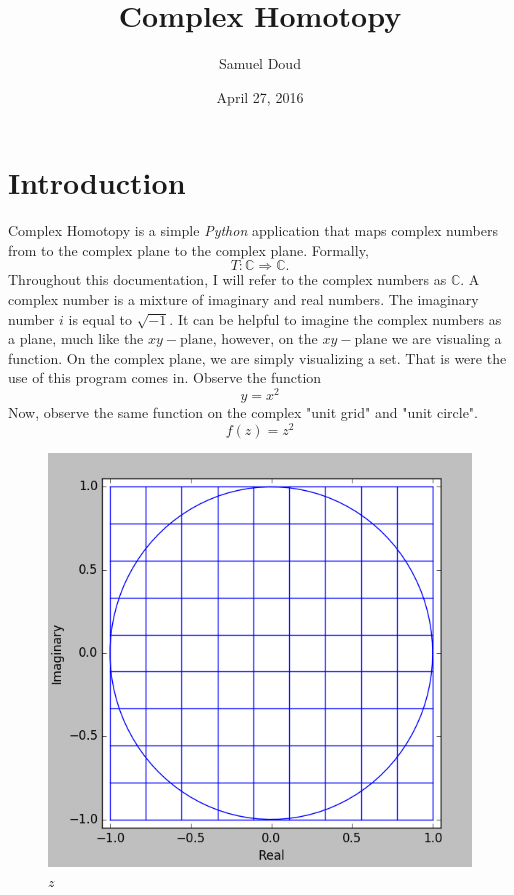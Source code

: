 \documentclass{article}
\title{Complex Homotopy}
\author{Samuel Doud}
\date{April 27, 2016}
\begin{document}
\maketitle

\section{Introduction}
    Complex Homotopy is a simple \textit{Python} application that maps complex numbers from to the complex plane to the complex plane. Formally,
    $$T:\mathbb{C}\Rightarrow \mathbb{C}.$$
    Throughout this documentation, I will refer to the complex numbers as $\mathbb{C}$. A complex number is a mixture of imaginary and real numbers. The imaginary number $i$ is equal to $\sqrt{-1}$. It can be helpful to imagine the complex numbers as a plane, much like the $xy-\text{plane}$, however, on the $xy-\text{plane}$ we are visualing a function. On the complex plane, we are simply visualizing a set. That is were the use of this program comes in.
    Observe the function 
    $$y=x^{2}$$
    Now, observe the same function on the complex "unit grid" and "unit circle".
    $$f(z) = z^{2}$$
    \begin{figure}[h]
        \centering
        \includegraphics[scale=.5]{z}
        \caption{$z$}
        \label{fig:my_label}
    \end{figure}
\end{document}
